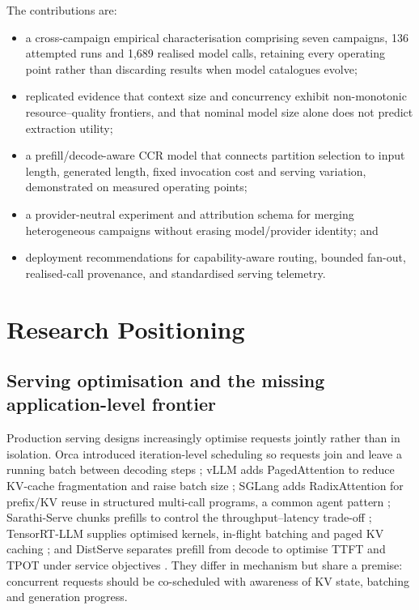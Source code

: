 \documentclass[conference]{IEEEtran}
\begin{document}
The contributions are:
\begin{itemize}
\item a cross-campaign empirical characterisation comprising seven campaigns, 136 attempted runs and 1{,}689 realised model calls, retaining every operating point rather than discarding results when model catalogues evolve;
\item replicated evidence that context size and concurrency exhibit non-monotonic resource--quality frontiers, and that nominal model size alone does not predict extraction utility;
\item a prefill/decode-aware CCR model that connects partition selection to input length, generated length, fixed invocation cost and serving variation, demonstrated on measured operating points;
\item a provider-neutral experiment and attribution schema for merging heterogeneous campaigns without erasing model/provider identity; and
\item deployment recommendations for capability-aware routing, bounded fan-out, realised-call provenance, and standardised serving telemetry.
\end{itemize}

\section{Research Positioning}
\subsection{Serving optimisation and the missing application-level frontier}
Production serving designs increasingly optimise requests jointly rather than in isolation. Orca introduced iteration-level scheduling so requests join and leave a running batch between decoding steps \cite{yu2022orca}; vLLM adds PagedAttention to reduce KV-cache fragmentation and raise batch size \cite{kwon2023vllm}; SGLang adds RadixAttention for prefix/KV reuse in structured multi-call programs, a common agent pattern \cite{zheng2024sglang}; Sarathi-Serve chunks prefills to control the throughput--latency trade-off \cite{agrawal2024sarathi}; TensorRT-LLM supplies optimised kernels, in-flight batching and paged KV caching \cite{nvidiaTensorRTLLM}; and DistServe separates prefill from decode to optimise TTFT and TPOT under service objectives \cite{zhong2024distserve}. They differ in mechanism but share a premise: concurrent requests should be co-scheduled with awareness of KV state, batching and generation progress.
\end{document}
